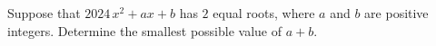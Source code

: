 Suppose that $2024\,x^{2}+ax+b$ has $2$ equal roots, where $a$ and $b$ are positive integers. Determine the smallest possible value of $a+b$. 
